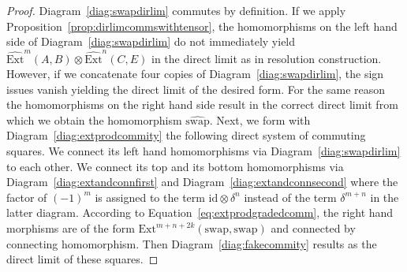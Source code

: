 \documentclass[10pt,a4paper]{amsart}
\begin{document}
\begin{proof}
Diagram~\ref{diag:swapdirlim} commutes by definition. If we apply Proposition~\ref{prop:dirlimcommswithtensor}, the homomorphisms on the left hand side of Diagram~\ref{diag:swapdirlim} do not immediately yield $\widehat{\mathrm{Ext}}^m(A, B) \otimes \widehat{\mathrm{Ext}}^n(C, E)$ in the direct limit as in resolution construction. However, if we concatenate four copies of Diagram~\ref{diag:swapdirlim}, the sign issues vanish yielding the direct limit of the desired form. For the same reason the homomorphisms on the right hand side result in the correct direct limit from which we obtain the homomorphism $\widehat{\mathrm{swap}}$. Next, we form with Diagram~\ref{diag:extprodcommity} the following direct system of commuting squares. We connect its left hand homomorphisms via Diagram~\ref{diag:swapdirlim} to each other. We connect its top and its bottom homomorphisms via Diagram~\ref{diag:extandconnfirst} and Diagram~\ref{diag:extandconnsecond} where the factor of $(-1)^m$ is assigned to the term $\mathrm{id} \otimes \delta^n$ instead of the term $\delta^{m+n}$ in the latter diagram. According to Equation~\ref{eq:extprodgradedcomm}, the right hand morphisms are of the form $\mathrm{Ext}^{m+n+2k}(\mathrm{swap}, \mathrm{swap})$ and connected by connecting homomorphism. Then Diagram~\ref{diag:fakecommity} results as the direct limit of these squares.
\end{proof}
\end{document}
